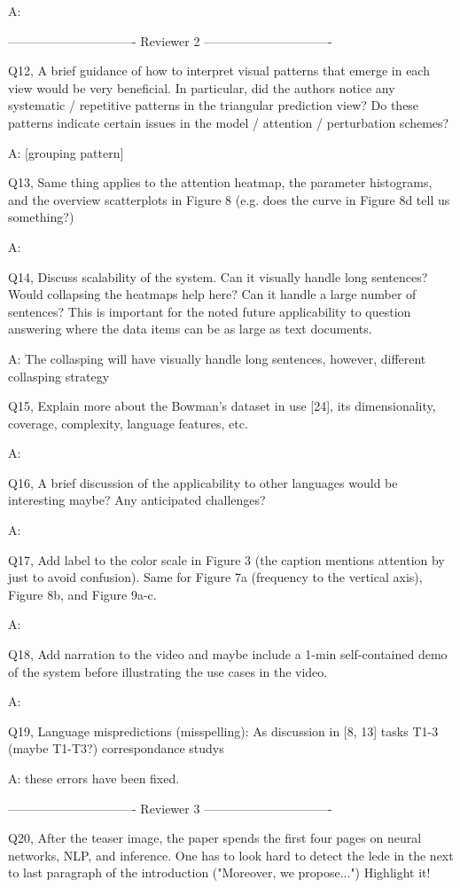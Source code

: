 A:

------------------------------- Reviewer 2 -------------------------------

Q12, A brief guidance of how to interpret visual patterns that emerge in each view would be very beneficial. In particular, did the authors notice any systematic / repetitive patterns in the triangular prediction view? Do these patterns indicate certain issues in the model / attention / perturbation schemes?

A: [grouping pattern]

Q13, Same thing applies to the attention heatmap, the parameter histograms, and the overview scatterplots in Figure 8 (e.g. does the curve in Figure 8d tell us something?)

A:

Q14, Discuss scalability of the system. Can it visually handle long sentences? Would collapsing the heatmaps help here? Can it handle a large number of sentences? This is important for the noted future applicability to question answering where the data items can be as large as text documents.

A: The collasping will have visually handle long sentences, however, different collasping strategy 

Q15, Explain more about the Bowman's dataset in use [24], its dimensionality, coverage, complexity, language features, etc.

A:

Q16, A brief discussion of the applicability to other languages would be interesting maybe? Any anticipated challenges?

A:

Q17, Add label to the color scale in Figure 3 (the caption mentions attention by just to avoid confusion). Same for Figure 7a (frequency to the vertical axis), Figure 8b, and Figure 9a-c.

A:

Q18, Add narration to the video and maybe include a 1-min self-contained demo of the system before illustrating the use cases in the video.

A:

Q19, Language mispredictions (misspelling):
As discussion in [8, 13]
tasks T1-3 (maybe T1-T3?)
correspondance
studys

A: these errors have been fixed.

------------------------------- Reviewer 3 -------------------------------

Q20, After the teaser image, the paper spends the first four pages on neural networks, NLP, and inference. One has to look hard to detect the lede in the next to last paragraph of the introduction ("Moreover, we propose...") Highlight it!

